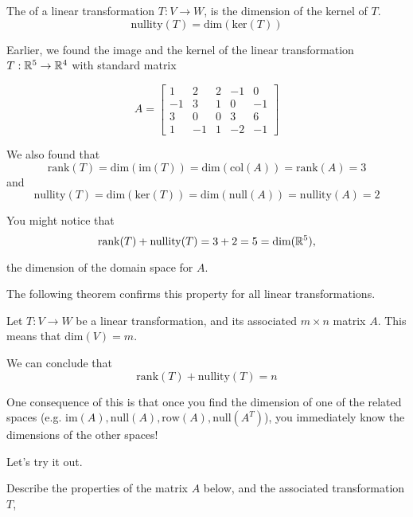 \documentclass{ximera}
\begin{document}
\begin{definition}\label{def:nullityT}
The  of a linear transformation $T:V\rightarrow W$, is the dimension of the kernel of $T$.
$$\mbox{nullity}(T)=\mbox{dim}(\mbox{ker}(T))$$
\end{definition}

Earlier, we found the image and the kernel of the linear transformation $T:\mathbb{R}^5\rightarrow \mathbb{R}^4$ with standard matrix
 
$$A=\begin{bmatrix}1 & 2 & 2 &-1 & 0\\-1 & 3 & 1 & 0 & -1\\3 & 0 & 0 & 3 & 6\\ 1 & -1 & 1 & -2 & -1\end{bmatrix}$$
 
We also found that
$$\mbox{rank}(T)=\mbox{dim}(\mbox{im}(T))=\mbox{dim}(\mbox{col}(A))=\mbox{rank}(A)=3$$
and
$$\mbox{nullity}(T)=\mbox{dim}(\mbox{ker}(T))=\mbox{dim}(\mbox{null}(A))=\mbox{nullity}(A)=2$$
 
You might notice that
$$\mbox{rank}(T)+\mbox{nullity}(T)=3+2=5=\mbox{dim}(\mathbb{R}^5),$$

the dimension of the domain space for $A$.
 
The following theorem confirms this property for all linear transformations.
 
\begin{theorem}\label{th:ranknullityforT}
Let $T:V\rightarrow W$ be a linear transformation, and its associated $m\times n$ matrix $A$. This means that $\mbox{dim}(V)=m$.

We can conclude that
$$\mbox{rank}(T)+\mbox{nullity}(T)=n$$
\end{theorem}
 
One consequence of this is that once you find the dimension of one of the related spaces (e.g. $\mbox{im}(A), \mbox{null}(A), \mbox{row}(A), \mbox{null}(A^T)$), you immediately know the dimensions of the other spaces!

Let's try it out.


Describe the properties of the matrix $A$ below, and the associated transformation $T$,
\end{document}
